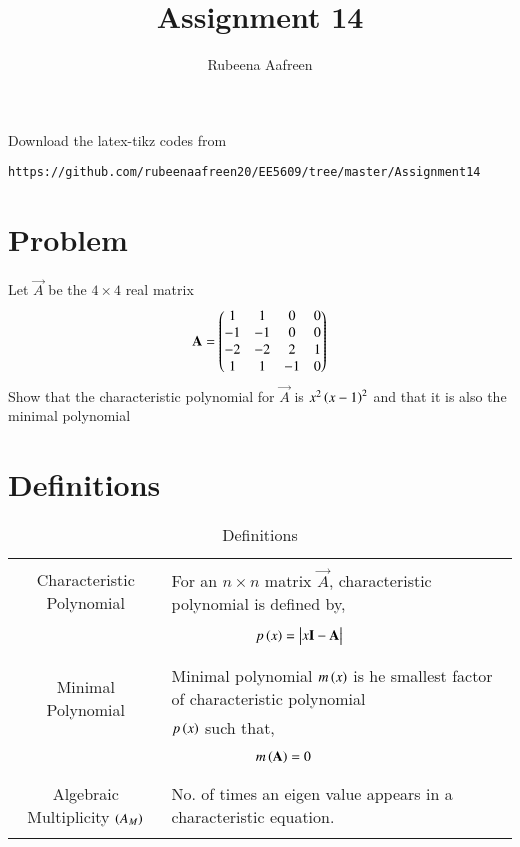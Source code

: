 \documentclass[journal,12pt]{IEEEtran}
\begin{document}
     \def\rightbox#1{\makebox[0in][r]{#1}}
     \def\centbox#1{\makebox[0in]{#1}}
     \def\topbox#1{\raisebox{-\baselineskip}[0in][0in]{#1}}
     \def\midbox#1{\raisebox{-0.5\baselineskip}[0in][0in]{#1}}
\vspace{3cm}
\title{Assignment 14}
\author{Rubeena Aafreen}
\maketitle
\bigskip
\renewcommand{\thefigure}{\theenumi}
\renewcommand{\thetable}{\theenumi}
%
Download the latex-tikz codes from 
%
\begin{lstlisting}
https://github.com/rubeenaafreen20/EE5609/tree/master/Assignment14
\end{lstlisting}
\section{\textbf{Problem}}
%
Let $\Vec{A}$ be the $4\times 4$ real matrix
\begin{align}
    \Vec{A}=\myvec{1&1&0&0\\-1&-1&0&0\\-2&-2&2&1\\1&1&-1&0}
\end{align}
Show that the characteristic polynomial for $\Vec{A}$ is $x^2\left(x-1\right)^2$ and that it is also the minimal polynomial
\section{\textbf{Definitions}}
\renewcommand{\thetable}{1}
\begin{table}[ht!]
\centering
\begin{tabular}{|c|l|}
    \hline
	\multirow{3}{*}{Characteristic Polynomial} 
	& \\
	& For an $n\times n$ matrix $\vec{A}$, characteristic polynomial is defined by,\\
	&\\
	& $\qquad\qquad\qquad p\brak{x}=\mydet{x\Vec{I}-\Vec{A}}$\\
	&\\
	\hline
	\multirow{3}{*}{Minimal Polynomial} 
	&\\
	& Minimal polynomial $m\left(x\right)$ is he smallest factor of characteristic polynomial\\
	& $p\left(x\right)$ such that,\\
	&\\
	& $\qquad \qquad \qquad m\left(\mathbf{A}\right)=0$\\
	&\\
    \hline
    \multirow{3}{*}{Algebraic Multiplicity $\left(A_M\right)$}
    &\\
    & No. of times an eigen value appears in a characteristic equation.\\
    &\\
    \hline
\end{tabular}
\label{table:1}
    \caption{Definitions}
\end{table}
\newpage
\end{document}
